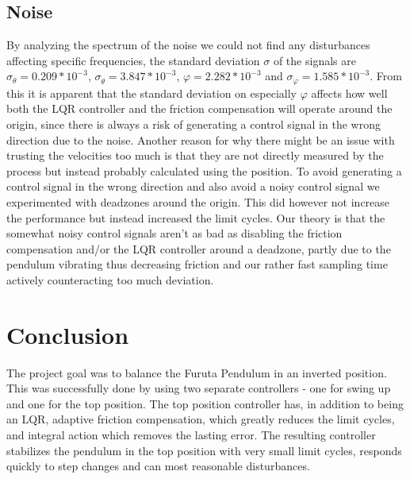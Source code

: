 \documentclass[10pt,a4paper]{article}
\begin{document}
\subsection{Noise}
By analyzing the spectrum of the noise we could not find any disturbances affecting specific frequencies, the standard deviation $ \sigma $ of the signals are $ \sigma_{ \theta } =  0.209*10^{-3} $, $ \sigma_{\dot{ \theta }}  = 3.847*10^{-3} $, $  \varphi = 2.282*10^{-3} $ and $ \sigma_{ \dot{ \varphi }} = 1.585*10^{-3} $. From this it is apparent that the standard deviation on especially $ \varphi $ affects how well both the LQR controller and the friction compensation will operate around the origin, since there is always a risk of generating a control signal in the wrong direction due to the noise. Another reason for why there might be an issue with trusting the velocities too much is that they are not directly measured by the process but instead probably calculated using the position.
To avoid generating a control signal in the wrong direction and also avoid a noisy control signal we experimented with deadzones around the origin.  This did however not increase the performance but instead increased the limit cycles. Our theory is that the somewhat noisy control signals aren't as bad as disabling the friction compensation and/or the LQR controller around a deadzone, partly due to the pendulum vibrating thus decreasing friction and our rather fast sampling time actively counteracting too much deviation.
\section{Conclusion}
The project goal was to balance the Furuta Pendulum in an inverted position. This was successfully done by using two separate controllers - one for swing up and one for the top position. The top position controller has, in addition to being an LQR, adaptive friction compensation, which greatly reduces the limit cycles, and integral action which removes the lasting error. The resulting controller stabilizes the pendulum in the top position with very small limit cycles, responds quickly to step changes and can most reasonable disturbances.
\end{document}
